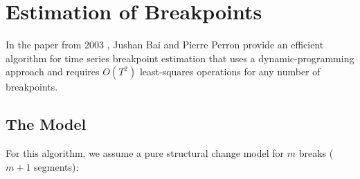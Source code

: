 \documentclass[main.tex]{subfiles}
\begin{document}
\chapter{Estimation of Breakpoints}
\label{chap:breakpoints}
In the paper from 2003 \cite{bai_perron}, Jushan Bai and Pierre Perron provide an
efficient algorithm for time series breakpoint estimation that uses a dynamic-programming
approach and requires $O(T^2)$ least-squares operations for any number of breakpoints.

\section{The Model}
\label{sec:breakpoints_the_model}
For this algorithm, we assume a pure structural change model for $m$ breaks ($m+1$ segments):
\end{document}

